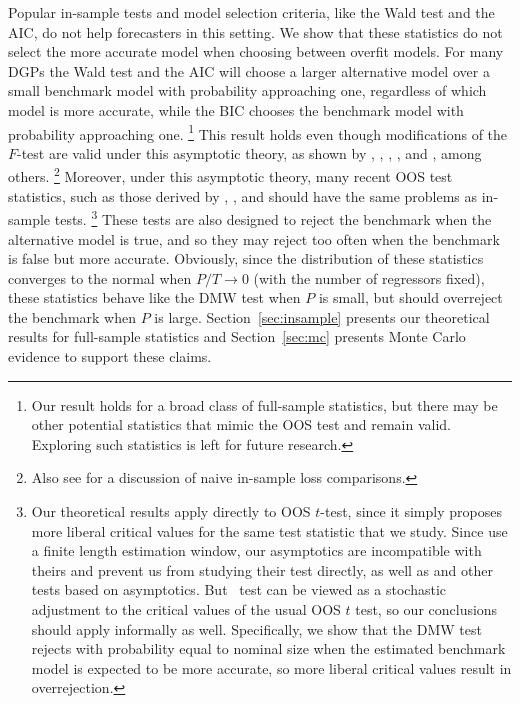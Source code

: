 \documentclass[12pt]{article}
\begin{document}
Popular in-sample tests and model selection criteria, like the Wald
test and the AIC, do not help forecasters in this setting. We show
that these statistics do not select the more accurate model when
choosing between overfit models. For many DGPs the Wald test and the
AIC will choose a larger alternative model over a small benchmark
model with probability approaching one, regardless of which model is
more accurate, while the BIC chooses the benchmark model with
probability approaching one.%
\footnote{Our result holds for a broad class of
  full-sample statistics, but there may be other potential statistics
  that mimic the OOS test and remain valid. Exploring such
  statistics is left for future research.} %
This result holds even though modifications of the $F$-test are valid
under this asymptotic theory, as shown by \citet{BoB:95},
\citet{AkA:00}, \citet{AkP:04}, \citet{Cal:11c}, and \citet{Ana:12},
among others.%
\footnote{Also see \citet{Efr:86,Efr:04} for a discussion
  of naive in-sample loss comparisons.} %
Moreover, under this asymptotic theory, many recent OOS test
statistics, such as those derived by \cite{ClM:01,ClM:05},
\citet{Mcc:07}, and \citet{ClW:06,ClW:07} should have the same
problems as in-sample tests.%
\footnote{Our theoretical results apply
  directly to  OOS $t$-test, since it simply
  proposes more liberal critical values for the same test statistic
  that we study.  Since \citet{ClW:06,ClW:07} use a finite length
  estimation window, our asymptotics are incompatible with theirs and
  prevent us from studying their test directly, as well as
   and other tests based on 
  asymptotics.  But \clws\ test can be viewed as a stochastic
  adjustment to the critical values of the usual OOS $t$ test, so
  our conclusions should apply informally as well.  Specifically, we
  show that the DMW test rejects with probability equal to nominal
  size when the estimated benchmark model is expected to be more
  accurate, so more liberal critical values result in overrejection.} %
These tests are also designed to reject the benchmark when the
alternative model is true, and so they may reject too often when the
benchmark is false but more accurate.  Obviously, since the
distribution of these statistics converges to the normal when $P/T \to
0$ (with the number of regressors fixed), these statistics behave like
the DMW test when $P$ is small, but should overreject the benchmark
when $P$ is large. Section~\ref{sec:insample} presents our theoretical
results for full-sample statistics and Section~\ref{sec:mc} presents
Monte Carlo evidence to support these claims.
\end{document}
